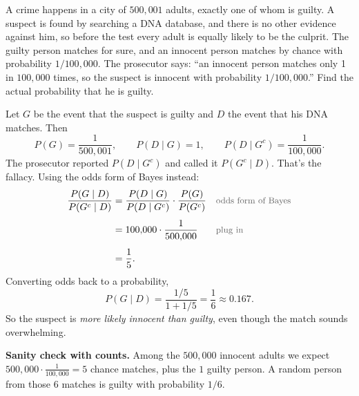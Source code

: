 \begin{example}\label{ex:dna}
A crime happens in a city of $500{,}001$ adults, exactly one of whom is guilty. A suspect is found by searching a DNA database, and there is no other evidence against him, so before the test every adult is equally likely to be the culprit. The guilty person matches for sure, and an innocent person matches by chance with probability $1/100{,}000$. The prosecutor says: ``an innocent person matches only 1 in $100{,}000$ times, so the suspect is innocent with probability $1/100{,}000$.'' Find the actual probability that he is guilty.
\end{example}
\begin{solution}
Let $G$ be the event that the suspect is guilty and $D$ the event that his DNA matches. Then
\[
P(G) = \frac{1}{500{,}001},
\qquad
P(D \mid G) = 1,
\qquad
P(D \mid G^c) = \frac{1}{100{,}000}.
\]
The prosecutor reported $P(D \mid G^c)$ and called it $P(G^c \mid D)$. That's the fallacy. Using the odds form of Bayes instead:
\begin{align*}
\frac{P(G \mid D)}{P(G^c \mid D)}
  &= \frac{P(D \mid G)}{P(D \mid G^c)} \cdot \frac{P(G)}{P(G^c)}
  && \by{odds form of Bayes} \\[0.4em]
  &= 100{,}000 \cdot \frac{1}{500{,}000}
  && \by{plug in} \\[0.4em]
  &= \frac{1}{5}.
\end{align*}
Converting odds back to a probability,
\[
P(G \mid D) = \frac{1/5}{1 + 1/5} = \frac{1}{6} \approx 0.167.
\]
So the suspect is \emph{more likely innocent than guilty}, even though the match sounds overwhelming.

\textbf{Sanity check with counts.} Among the $500{,}000$ innocent adults we expect $500{,}000 \cdot \frac{1}{100{,}000} = 5$ chance matches, plus the $1$ guilty person. A random person from those $6$ matches is guilty with probability $1/6$.
\end{solution}

